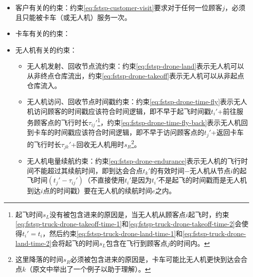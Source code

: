 \begin{itemize}
    \item \colorbox{shallow-green}{客户有关的约束：}约束\ref{eq:fstsp-customer-visit}要求对于任何一位顾客$j$，必须且只能被卡车（或无人机）服务一次。
    \item \colorbox{shallow-purple}{卡车有关的约束：}
    \item \colorbox{shallow-red}{无人机有关的约束：}
    \begin{itemize}
        \item 无人机发射、回收节点流约束：约束\ref{eq:fstsp-drone-land}表示无人机可以从非终点仓库流出，约束\ref{eq:fstsp-drone-takeoff}表示无人机可以从非起点仓库流入。
        \item 无人机访问、回收节点时间戳约束：约束\ref{eq:fstsp-drone-time-fly}表示无人机访问顾客的时间戳应该符合时间逻辑，即不早于起飞时间戳$t_i'$+前往服务顾客点的飞行时长$\tau_{ij}'$\footnote{起飞时间$s_L$没有被包含进来的原因是，当无人机从顾客点$i$起飞时，约束\ref{eq:fstsp-truck-drone-takeoff-time-1}和\ref{eq:fstsp-truck-drone-takeoff-time-2}会使得$t_i' = t_i$，然后约束\ref{eq:fstsp-truck-drone-land-time-1}和\ref{eq:fstsp-truck-drone-land-time-2}会将起飞的时间$s_L$包含在飞行到顾客点$j$的时间内。}，约束\ref{eq:fstsp-drone-time-fly-back}表示无人机回到卡车的时间戳应该符合时间逻辑，即不早于访问顾客点的$t_j'$+返回卡车的飞行时长$\tau_{jk}'$+回收无人机用时$s_R$\footnote{这里降落的时间$s_R$必须被包含进来的原因是，卡车可能比无人机更快到达会合点$k$（原文中举出了一个例子以助于理解\cite{murrayFlyingSidekickTraveling2015}）。}。
        \item 无人机电量续航约束：约束\ref{eq:fstsp-drone-endurance}表示无人机的飞行时间不能超过其续航时间，即到达会合点$t_k'$的有效时间$-$无人机从节点$i$的起飞时间$(t_j'-\tau_{ij}')$（不直接使用$t_i'$是因为$t_i'$不是起飞的时间戳而是无人机到达$i$点的时间戳）要在无人机的续航时间$e$之内。

\end{itemize}
\end{itemize}
